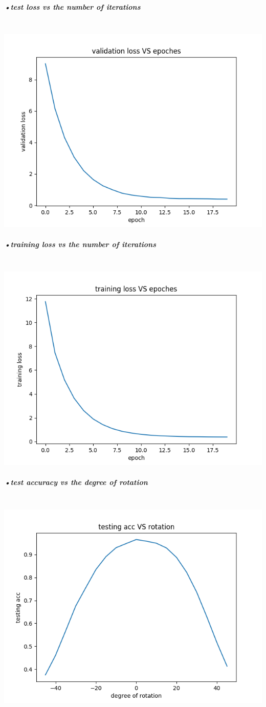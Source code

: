 \documentclass[11pt]{article} %
\begin{document}
\subparagraph{•test loss vs the number of iterations}\mbox{}\\
\includegraphics[scale=0.5]{e141val_loss.png}
\subparagraph{•training loss vs the number of iterations}\mbox{}\\
\includegraphics[scale=0.5]{e141train_loss.png}
\subparagraph{•test accuracy vs the degree of rotation}\mbox{}\\
\includegraphics[scale=0.5]{e141rotation.png}
\end{document}
